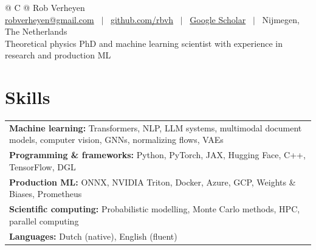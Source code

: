 \documentclass[a4paper,10pt]{article}
\begin{document}
\fontsize{10.5pt}{11.8pt}\selectfont
\RaggedRight
{}
\setlength{\parskip}{3pt}
\pagestyle{empty}

\begin{tabularx}{\linewidth}{@{} C @{}}
\huge{Rob Verheyen} \\[2pt]
\href{mailto:robverheyen@gmail.com}{robverheyen@gmail.com} \ $|$ \
\href{https://github.com/rbvh}{github.com/rbvh} \ $|$ \
\href{https://scholar.google.com/citations?user=MRTAm7UAAAAJ}{Google Scholar} \ $|$ \
Nijmegen, The Netherlands \\[3pt]
Theoretical physics PhD and machine learning scientist with experience in research and production ML
\end{tabularx}

\section{Skills}
\begin{tabularx}{\linewidth}{@{}X@{}}
\textbf{Machine learning:} Transformers, NLP, LLM systems, multimodal document models, computer vision, GNNs, normalizing flows, VAEs \\
\textbf{Programming \& frameworks:} Python, PyTorch, JAX, Hugging Face, C++, TensorFlow, DGL \\
\textbf{Production ML:} ONNX, NVIDIA Triton, Docker, Azure, GCP, Weights \& Biases, Prometheus \\
\textbf{Scientific computing:} Probabilistic modelling, Monte Carlo methods, HPC, parallel computing \\
\textbf{Languages:} Dutch (native), English (fluent) \\
\end{tabularx}
\end{document}
